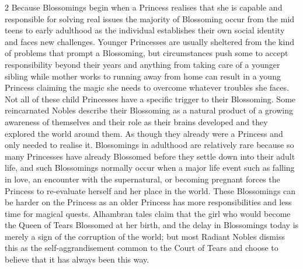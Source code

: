 \begin{multicols}{2}
Because Blossomings begin when a Princess realises that she is capable and responsible for solving real issues the majority of Blossoming occur from the mid teens to early adulthood as the individual establishes their own social identity and faces new challenges. Younger Princesses are usually sheltered from the kind of problems that prompt a Blossoming, but circumstances push some to accept responsibility beyond their years and anything from taking care of a younger sibling while mother works to running away from home can result in a young Princess claiming the magic she needs to overcome whatever troubles she faces. Not all of these child Princesses have a specific trigger to their Blossoming. Some reincarnated Nobles describe their Blossoming as a natural product of a growing awareness of themselves and their role as their brains developed and they explored the world around them. As though they already were a Princess and only needed to realise it. Blossomings in adulthood are relatively rare because so many Princesses have already Blossomed before they settle down into their adult life, and such Blossomings normally occur when a major life event such as falling in love, an encounter with the supernatural, or becoming pregnant forces the Princess to re-evaluate herself and her place in the world. These Blossomings can be harder on the Princess as an older Princess has more responsibilities and less time for magical quests. Alhambran tales claim that the girl who would become the Queen of Tears Blossomed at her birth, and the delay in Blossomings today is merely a sign of the corruption of the world; but most Radiant Nobles dismiss this as the self-aggrandisement common to the Court of Tears and choose to believe that it has always been this way. 
 


\end{multicols}
